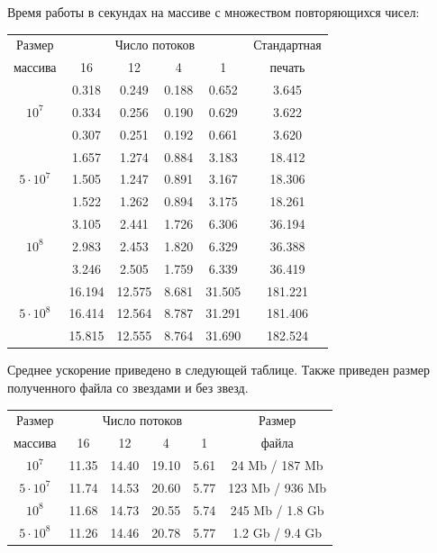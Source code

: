 \documentclass[specialist,subf,href,colorlinks=true,14pt
,times,mtpro,specialist
]{disser}
\begin{document}
Время работы в секундах на массиве с множеством повторяющихся чисел:
\begin{center}
\begin{tabular}{||c|c|c|c|c|c||}
\hline
\hline
Размер & \multicolumn{4}{c|}{Число потоков} & Стандартная\\
\hhline{~|-|-|-|-|~|}
массива & 16 & 12 & 4 & 1 & печать \\
\hline
\hline
& 0.318 & 0.249 & 0.188 & 0.652 & 3.645 \\
\hhline{~|-|-|-|-|-|}
$10^7$ & 0.334 & 0.256 & 0.190 & 0.629 & 3.622 \\
\hhline{~|-|-|-|-|-|}
& 0.307 & 0.251 & 0.192 & 0.661 & 3.620 \\
\hline
& 1.657 & 1.274 & 0.884 & 3.183 & 18.412 \\
\hhline{~|-|-|-|-|-|}
$5 \cdot 10^7$ & 1.505 & 1.247 & 0.891 & 3.167 & 18.306 \\
\hhline{~|-|-|-|-|-|}
& 1.522 & 1.262 & 0.894 & 3.175 & 18.261 \\
\hline
& 3.105 & 2.441 & 1.726 & 6.306 & 36.194 \\
\hhline{~|-|-|-|-|-|}
$10^8$ & 2.983 & 2.453 & 1.820 & 6.329 & 36.388 \\
\hhline{~|-|-|-|-|-|}
& 3.246 & 2.505 & 1.759 & 6.339 &  36.419 \\
\hline
& 16.194 & 12.575 & 8.681 & 31.505 & 181.221 \\
\hhline{~|-|-|-|-|-|}
$5 \cdot 10^8$ & 16.414 & 12.564 & 8.787 & 31.291 & 181.406 \\
\hhline{~|-|-|-|-|-|}
& 15.815 & 12.555  & 8.764 & 31.690 & 182.524 \\
\hline
\hline
\end{tabular}
\end{center}
Среднее ускорение приведено в следующей таблице.
Также приведен размер полученного файла со звездами и без звезд.
\begin{center}
\begin{tabular}{||c|c|c|c|c|c||}
\hline
\hline
Размер & \multicolumn{4}{c|}{Число потоков} & Размер\\
\hhline{~|-|-|-|-|~|}
массива & 16 & 12 & 4 & 1 & файла \\
\hline
$10^7$  & 11.35 & 14.40 & 19.10 & 5.61 & 24 Mb / 187 Mb \\
\hline
$5 \cdot 10^7$ &11.74 & 14.53 & 20.60 & 5.77 & 123 Mb / 936 Mb\\
\hline
$10^8$ &11.68 & 14.73 & 20.55 & 5.74 & 245 Mb / 1.8 Gb \\
\hline
$5 \cdot 10^8$ &11.26 & 14.46 & 20.78 & 5.77 & 1.2 Gb / 9.4 Gb\\
\hline
\hline
\end{tabular}
\end{center}
\end{document}
